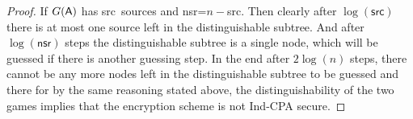 \documentclass{article}
\def\A{{\sf A}}
\begin{document}
\begin{proof}
\def\src{{\sf src}}
\def\nsr{{\sf nsr}}

If $G(\A)$ has \src~sources and \nsr=$n-$\src. Then clearly after $\log(\mathsf{src})$ there is at most one source left in the distinguishable subtree. And after $\log(\mathsf{nsr})$ steps the distinguishable subtree is a single node, which will be guessed if there is another guessing step. In the end after $2\log(n)$ steps, there cannot be any more nodes left in the distinguishable subtree to be guessed and there for by the same reasoning stated above, the distinguishability of the two games implies that the encryption scheme is not Ind-CPA secure.
\end{proof}
\end{document}
